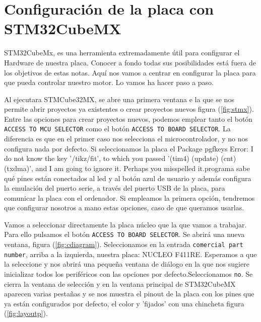 \chapter{Configuración de la placa con STM32CubeMX}
STM32CubeMx, es una herramienta extremadamente útil para configurar el Hardware de nuestra placa. Conocer a fondo todas sus posibilidades está fuera de los objetivos de estas notas. Aquí nos vamos a centrar en configurar la placa para que pueda controlar nuestro motor. Lo vamos ha hacer paso a paso.

Al ejecutara STMCube32MX, se abre una primera ventana e la que se nos permite abrir proyectos ya existentes o crear proyectos nuevos figura (\ref{fig:stmx}). Entre las opciones para crear proyectos nuevos, podemos emplear tanto el botón \texttt{ACCESS TO MCU SELECTOR} como el botón \texttt{ACCESS TO BOARD SELECTOR}. La diferencia es que en el primer caso nos selecciona el microcontrolador, y no nos configura nada por defecto. Si seleccionamos la placa el Package pgfkeys Error: I do not know the key '/tikz/fit', to which you passed '(tim4) (update) (cnt) (txdma)', and I am going to ignore it. Perhaps you misspelled it.programa sabe qué pines están conectados al led y al botón azul de usuario y además configura la emulación del puerto serie, a través del puerto USB de la placa, para comunicar la placa con el ordenador. Si empleamos la primera opción, tendremos que configurar nosotros a mano estas opciones, caso de que queramos usarlas.

Vamos a seleccionar directamente la placa núcleo que la que vamos a trabajar. Para ello pulsamos el botón \texttt{ACCESS TO BOARD SELECTOR}. Se abrirá una nueva ventana, figura (\ref{fig:cdiagram}). Seleccionamos en la entrada \texttt{comercial part number}, arriba a la izquierda, nuestra placa: NUCLEO F411RE. Esperamos a que la seleccione y nos abrirá una pequeña ventana de diálogo en la que nos sugiere inicializar todos los periféricos con las opciones por defecto.Seleccionamos \texttt{no}. Se cierra la ventana de selección y en la ventana principal de STM32CubeMX aparecen varias pestañas y se nos muestra el pinout de la placa con los pines que ya están configurados por defecto, el color y 'fijados' con una chincheta figura (\ref{fig:layoutp}).

